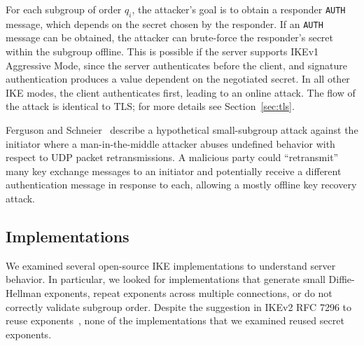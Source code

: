 For each subgroup of order $q_i$, the attacker's goal is to obtain a responder
\texttt{AUTH} message, which depends on the secret chosen by the responder. If
an \texttt{AUTH} message can be obtained, the attacker can brute-force the
responder's secret within the subgroup offline. This is possible if the server
supports IKEv1 Aggressive Mode, since the server authenticates before the
client, and signature authentication produces a value dependent on the
negotiated secret.  In all other IKE modes, the client authenticates first,
leading to an online attack. The flow of the attack is identical to TLS; for
more details see Section~\ref{sec:tls}.

Ferguson and Schneier~\cite{ferguson2000cryptographic} describe a hypothetical
small-subgroup attack against the initiator where a man-in-the-middle attacker
abuses undefined behavior with respect to UDP packet retransmissions. A
malicious party could ``retransmit'' many key exchange messages to an initiator
and potentially receive a different authentication message in response to each,
allowing a mostly offline key recovery attack.


\subsection{Implementations}

We examined several open-source IKE implementations to understand server
behavior.  In particular, we looked for implementations that generate small
Diffie-Hellman exponents, repeat exponents across multiple connections, or do
not correctly validate subgroup order. Despite the suggestion in IKEv2 RFC 7296
to reuse exponents~\cite{rfc7296}, none of the implementations that we examined
reused secret exponents. 


